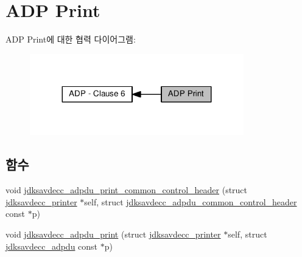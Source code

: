 \hypertarget{group__adp__print}{}\section{A\+DP Print}
\label{group__adp__print}
A\+DP Print에 대한 협력 다이어그램\+:
\nopagebreak
\begin{figure}[H]
\begin{center}
\leavevmode
\includegraphics[width=263pt]{group__adp__print}
\end{center}
\end{figure}
\subsection*{함수}
\begin{DoxyCompactItemize}
\item 
void \hyperlink{group__adp__print_ga744463f0fee49761a57b82dcddd2a962}{jdksavdecc\+\_\+adpdu\+\_\+print\+\_\+common\+\_\+control\+\_\+header} (struct \hyperlink{structjdksavdecc__printer}{jdksavdecc\+\_\+printer} $\ast$self, struct \hyperlink{structjdksavdecc__adpdu__common__control__header}{jdksavdecc\+\_\+adpdu\+\_\+common\+\_\+control\+\_\+header} const $\ast$p)
\item 
void \hyperlink{group__adp__print_gaeb2bdf6561cdf20949ee640d7c3d3666}{jdksavdecc\+\_\+adpdu\+\_\+print} (struct \hyperlink{structjdksavdecc__printer}{jdksavdecc\+\_\+printer} $\ast$self, struct \hyperlink{structjdksavdecc__adpdu}{jdksavdecc\+\_\+adpdu} const $\ast$p)
\end{DoxyCompactItemize}
